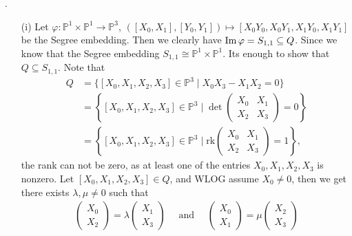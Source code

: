 \documentclass[12pt]{article}
\begin{document}
\sol.
\begin{enumerate}
    \item[(i)] Let $\varphi : \mathbb{P}^1 \times \mathbb{P}^1 \to \mathbb{P}^3$, $([X_0,X_1],[Y_0,Y_1]) \mapsto [X_0Y_0, X_0Y_1, X_1Y_0, X_1Y_1]$ be the Segree embedding. Then we clearly have $\operatorname{Im} \varphi = S_{1,1} \subseteq Q$. Since we know that the Segree embedding $S_{1,1} \cong \mathbb{P}^1 \times \mathbb{P}^1$. Its enough to show that $Q \subseteq S_{1,1}$. Note that
        \begin{align*}
            Q & = \{ [X_0,X_1,X_2,X_3] \in \mathbb{P}^3 \mid X_0X_3 - X_1X_2 = 0 \}                                                             \\
              & = \left\{ [X_0,X_1,X_2,X_3] \in \mathbb{P}^3 \mid \det\begin{pmatrix} X_0 & X_1 \\ X_2 & X_3 \end{pmatrix} = 0\right\}          \\
              & = \left\{ [X_0,X_1,X_2,X_3] \in \mathbb{P}^3 \mid \mathrm{rk}\begin{pmatrix} X_0 & X_1 \\ X_2 & X_3 \end{pmatrix} = 1 \right\},
        \end{align*}
        the rank can not be zero, as at least one of the entries $X_0, X_1, X_2, X_3$ is nonzero. Let $[X_0,X_1,X_2,X_3] \in Q$, and WLOG assume $X_0 \neq 0$, then we get there exists $\lambda, \mu \neq 0$ such that
        \begin{align*}
            \begin{pmatrix}
                X_0 \\ X_2
            \end{pmatrix} = \lambda \begin{pmatrix}
                                        X_1 \\ X_3
                                    \end{pmatrix}  \quad \mbox{ and } \quad \begin{pmatrix}
                                                                                X_0 \\ X_1
                                                                            \end{pmatrix} = \mu \begin{pmatrix}
                                                                                                    X_2 \\ X_3

\end{pmatrix}
\end{align*}
\end{enumerate}
\end{document}
